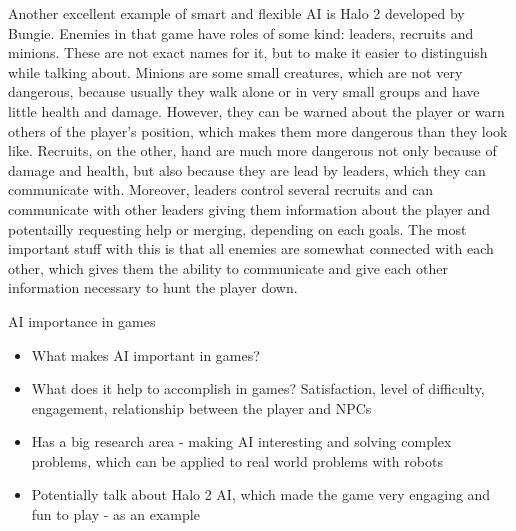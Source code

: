 \documentclass[journal]{IEEEtran}
\begin{document}
Another excellent example of smart and flexible AI is Halo 2 developed by Bungie. Enemies in that game have roles of some kind: leaders, recruits and minions. These are not exact names for it, but to make it easier to distinguish while talking about. Minions are some small creatures, which are not very dangerous, because usually they walk alone or in very small groups and have little health and damage. However, they can be warned about the player or warn others of the player's position, which makes them more dangerous than they look like. Recruits, on the other, hand are much more dangerous not only because of damage and health, but also because they are lead by leaders, which they can communicate with. Moreover, leaders control several recruits and can communicate with other leaders giving them information about the player and potentailly requesting help or merging, depending on each goals. The most important stuff with this is that all enemies are somewhat connected with each other, which gives them the ability to communicate and give each other information necessary to hunt the player down.

AI importance in games
\begin{itemize}
	\item What makes AI important in games?
	\item What does it help to accomplish in games? Satisfaction, level of difficulty, engagement, relationship between the player and NPCs
	\item Has a big research area - making AI interesting and solving complex problems, which can be applied to real world problems with robots
	\item Potentially talk about Halo 2 AI, which made the game very engaging and fun to play - as an example
\end{itemize}
\end{document}
